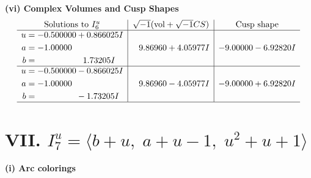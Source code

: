 \documentclass[1p]{elsarticle_modified}
\theoremstyle{definition}
\newcommand{\I}{\sqrt{-1}}
\begin{document}
\newpage\flushleft \textbf{(vi) Complex Volumes and Cusp Shapes}
$$\begin{array}{c|c|c}  
\text{Solutions to }I^u_{6}& \I (\text{vol} + \sqrt{-1}CS) & \text{Cusp shape}\\
 \hline 
\begin{aligned}
u &= -0.500000 + 0.866025 I \\
a &= -1.00000\phantom{ +0.000000I} \\
b &= \phantom{-0.000000 -}1.73205 I\end{aligned}
 & \phantom{-}9.86960 + 4.05977 I & -9.00000 - 6.92820 I \\ \hline\begin{aligned}
u &= -0.500000 - 0.866025 I \\
a &= -1.00000\phantom{ +0.000000I} \\
b &= \phantom{-0.000000 } -1.73205 I\end{aligned}
 & \phantom{-}9.86960 - 4.05977 I & -9.00000 + 6.92820 I\\
 \hline 
 \end{array}$$\newpage\newpage\renewcommand{\arraystretch}{1}
\centering \section*{VII. $I^u_{7}= \langle b+u,\;a+u-1,\;u^2+u+1 \rangle$}
\flushleft \textbf{(i) Arc colorings}\\
\end{document}
